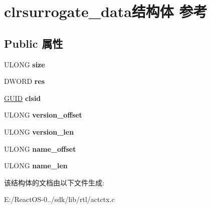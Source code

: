 \hypertarget{structclrsurrogate__data}{}\section{clrsurrogate\+\_\+data结构体 参考}
\label{structclrsurrogate__data}
\subsection*{Public 属性}
\begin{DoxyCompactItemize}
\item 
\mbox{\label{structclrsurrogate__data_a838c8d151ca1303300d899a903a67982}} 
U\+L\+O\+NG {\bfseries size}
\item 
\mbox{\label{structclrsurrogate__data_a2b5253c9e7cff464d7b1c54b7a60c2d5}} 
D\+W\+O\+RD {\bfseries res}
\item 
\mbox{\label{structclrsurrogate__data_a31b1e8c9ae0be79706826aba2dab21aa}} 
\hyperlink{interface_g_u_i_d}{G\+U\+ID} {\bfseries clsid}
\item 
\mbox{\label{structclrsurrogate__data_abb5a5681e64ca07eff5a6857241316c3}} 
U\+L\+O\+NG {\bfseries version\+\_\+offset}
\item 
\mbox{\label{structclrsurrogate__data_a2f21ecfd5079f6848ad71567a425dd73}} 
U\+L\+O\+NG {\bfseries version\+\_\+len}
\item 
\mbox{\label{structclrsurrogate__data_a312061f2f1a5a526378f372ef8e4721b}} 
U\+L\+O\+NG {\bfseries name\+\_\+offset}
\item 
\mbox{\label{structclrsurrogate__data_ac0204fd8c1357e463e69b4539b75c7dc}} 
U\+L\+O\+NG {\bfseries name\+\_\+len}
\end{DoxyCompactItemize}


该结构体的文档由以下文件生成\+:\begin{DoxyCompactItemize}
\item 
E\+:/\+React\+O\+S-\/0../sdk/lib/rtl/actctx.\+c\end{DoxyCompactItemize}
